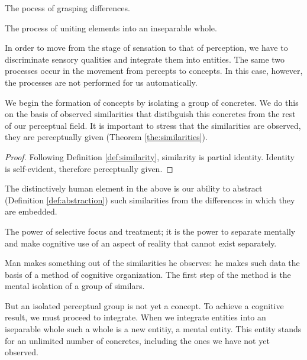             \begin{definition}[Differentiation]
            \label{def:differentiation}
                The pocess of grasping differences.
            \end{definition}

            \begin{definition}[Integration]
            \label{def:integration}
                The process of uniting elements into an inseparable whole.
            \end{definition}

        In order to move from the stage of sensation to that of perception, we have to discriminate sensory qualities and integrate them into entities. The same two processes occur in the movement from percepts to concepts. In this case, however, the processes are not performed for us automatically.

        We begin the formation of concepts by isolating a group of concretes. We do this on the basis of observed similarities that distibguish this concretes from the rest of our perceptual field. It is important to stress that the similarities are observed, they are perceptually given (Theorem \ref{the:similarities}).

        \begin{proof}
            Following Definition \ref{def:similarity}, similarity is partial identity. Identity is self-evident, therefore perceptually given.
        \end{proof}

        The distinctively human element in the above is our ability to abstract (Definition \ref{def:abstraction}) such similarities from the differences in which they are embedded.

            \begin{definition}[Abstraction]
            \label{def:abstraction}
                The power of selective focus and treatment; it is the power to separate mentally and make cognitive use of an aspect of reality that cannot exist separately.
            \end{definition}

        Man makes something out of the similarities he observes: he makes such data the basis of a method of cognitive organization. The first step of the method is the mental isolation of a group of similars.

        But an isolated perceptual group is not yet a concept. To achieve a cognitive result, we must proceed to integrate. When we integrate entities into an iseparable whole such a whole is a new entitiy, a mental entity. This entity stands for an unlimited number of concretes, including the ones we have not yet observed.

